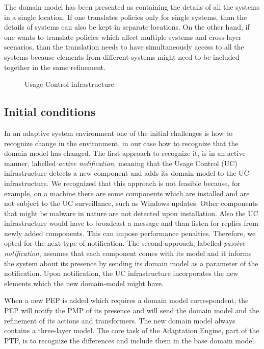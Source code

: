 \documentclass{sig-alternate}
\begin{document}
The domain model has been presented as containing the details of all the systems in a single location.
If one translates policies only for single systems, than the details of systems can also be kept in separate locations.
On the other hand, if one wants to translate policies which affect multiple systems and cross-layer scenarios, 
than the translation needs to have simultaneously access to all the systems
because elements from different systems might need to be included together in the same refinement.

\begin{figure}
\centering
{}
\caption{Usage Control infrastructure}
\label{fig:infrastructure}
\end{figure}

\subsection{Initial conditions}
In an adaptive system environment one of the initial challenges is how to recognize change in the environment,
in our case how to recognize that the domain model has changed.
The first approach to recognize it, is in an active manner, labelled \textit{active notification},
meaning that the Usage Control (UC) infrastructure detects a new component and adds its domain-model to the UC infrastructure.
We recognized that this approach is not feasible because, for example,
on a machine there are some components which are installed and are not subject to the UC surveillance, such as Windows updates.
Other components that might be malware in nature are not detected upon installation. 
Also the UC infrastructure would have to broadcast a message and than listen for replies from newly added components.
This can impose performance penalties. 
Therefore, we opted for the next type of notification.
The second approach, labelled \textit{passive notification}, assumes that each component comes with its model
and it informs the system about its presence by sending its domain model as a parameter of the notification. 
Upon notification, the UC infrastructure incorporates the new elements which the new domain-model might have.

When a new PEP is added which requires a domain model correspondent,
the PEP will notify the PMP of its presence and will send the domain model and the refinement of its actions and transformers.
The new domain model always contains a three-layer model.
The core task of the Adaptation Engine, part of the PTP, is to recognize the differences and include them in the base domain model.
\end{document}
